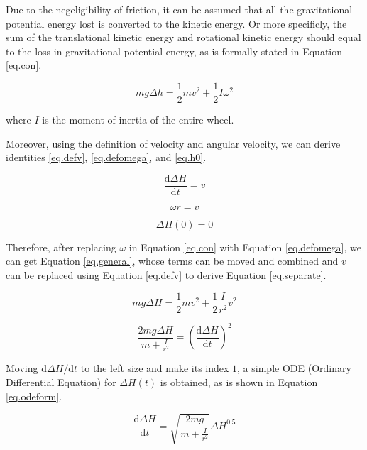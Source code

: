 \documentclass[a4paper]{article}
\begin{document}
Due to the negeligibility of friction, it can be assumed that all the gravitational potential energy lost is converted to the kinetic energy. Or more specificly, the sum of the translational kinetic energy and rotational kinetic energy should equal to the loss in gravitational potential energy, as is formally stated in Equation \ref{eq.con}.

\begin{equation}\label{eq.con}
    mg\Delta h = \frac{1}{2}m v^2 + \frac{1}{2} I \omega ^2
\end{equation}

where $I$ is the moment of inertia of the entire wheel. 

Moreover, using the definition of velocity and angular velocity, we can derive identities \ref{eq.defv}, \ref{eq.defomega}, and \ref{eq.h0}.

\begin{equation}\label{eq.defv}
    \dfrac{\mathrm{d}\Delta H}{\mathrm{d}t} = v
\end{equation}

\begin{equation}\label{eq.defomega}
    \omega r = v
\end{equation}

\begin{equation}\label{eq.h0}
    \Delta H(0) = 0
\end{equation}

Therefore, after replacing $\omega$ in Equation \ref{eq.con} with Equation \ref{eq.defomega}, we can get Equation \ref{eq.general}, whose terms can be moved and combined and $v$ can be replaced using Equation \ref{eq.defv} to derive Equation \ref{eq.separate}.

\begin{equation}\label{eq.general}
    mg\Delta H = \frac{1}{2}m v^2 + \frac{1}{2} \frac{I}{r^2} v ^2
\end{equation}

\begin{equation}\label{eq.separate}
    \frac{2mg\Delta H}{m+\frac{I}{r^2}} = (\dfrac{\mathrm{d}\Delta H}{\mathrm{d}t})^2
\end{equation}

Moving ${\mathrm{d}\Delta H}/{\mathrm{d}t}$ to the left size and make its index $1$, a simple ODE (Ordinary Differential Equation) for $\Delta H(t)$ is obtained, as is shown in Equation \ref{eq.odeform}.

\begin{equation}\label{eq.odeform}
    \dfrac{\mathrm{d}\Delta H}{\mathrm{d}t} = \sqrt{\frac{2mg}{m+\frac{I}{r^2}}} \Delta H ^ {0.5}
\end{equation}
\end{document}
